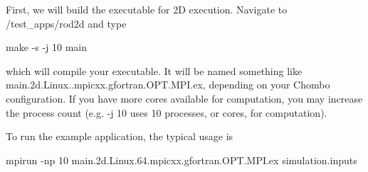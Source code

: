 First, we will build the executable for 2D execution. Navigate to /test\+\_\+apps/rod2d and type \begin{DoxyVerb}  make -s -j 10 main
\end{DoxyVerb}


which will compile your executable. It will be named something like main.\+2d.\+Linux..\+mpicxx.\+gfortran.\+O\+P\+T.\+M\+P\+I.\+ex, depending on your Chombo configuration. If you have more cores available for computation, you may increase the process count (e.\+g. -\/j 10 uses 10 processes, or cores, for computation).

To run the example application, the typical usage is \begin{DoxyVerb}  mpirun -np 10 main.2d.Linux.64.mpicxx.gfortran.OPT.MPI.ex simulation.inputs
\end{DoxyVerb}


